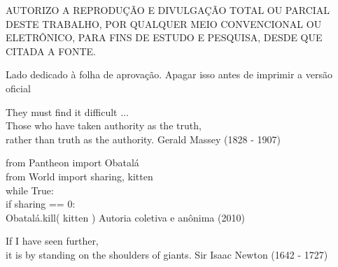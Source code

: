 \capa


\folhaderosto
% 
\pretextualchapter{}
	\thispagestyle{plain}
	\noindent \parbox{5.7in}{\centering AUTORIZO A REPRODUÇÃO E DIVULGAÇÃO TOTAL OU PARCIAL DESTE TRABALHO, POR QUALQUER MEIO CONVENCIONAL OU ELETRÔNICO, PARA FINS DE ESTUDO E PESQUISA, DESDE QUE CITADA A FONTE.}

\pretextualchapter{}
	Lado dedicado à folha de aprovação. Apagar isso antes de imprimir a versão oficial



\pretextualchapter{}
	\begin{epigrafetop}
		{They must find it difficult ... \\ Those who have taken authority as the truth, \\ rather than truth as the authority.} %
		{Gerald Massey (1828 - 1907)} %
	\end{epigrafetop}


	\begin{epigrafemid}
		{from Pantheon import Obatalá\, \, \, \\
                from World import sharing, kitten \\
                \vspace{.1in}
                while True: \; \; \; \; \; \; \; \; \; \; \; \; \; \; \; \,\\
                    if sharing == 0: \; \; \; \; \;  \; \; \; \; \; \\
                        Obatalá.kill( kitten ) \; \; \;}
        {Autoria coletiva e anônima (2010)}
	\end{epigrafemid}

	\begin{epigrafebot}
		{If I have seen further, \\it is by standing on the shoulders of giants.} %
		{Sir Isaac Newton (1642 - 1727)} %
	\end{epigrafebot}


